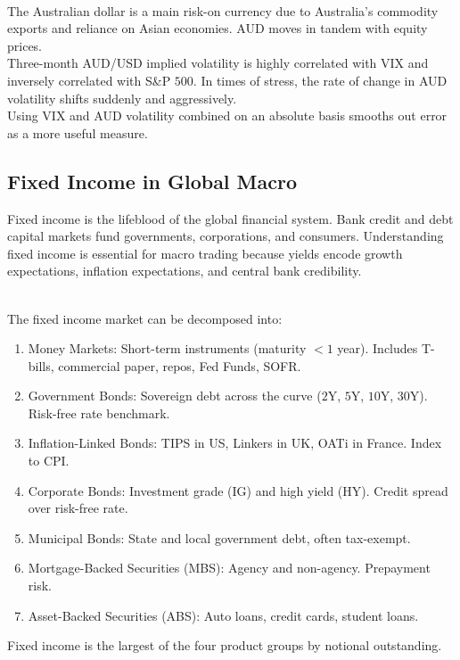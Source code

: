 \documentclass[a4paper,oneside,openany]{book}
\begin{document}
\begin{remark} \\
The Australian dollar is a main risk-on currency due to Australia's commodity exports and reliance on Asian economies. AUD moves in tandem with equity prices.\\
Three-month AUD/USD implied volatility is highly correlated with VIX and inversely correlated with S\&P $500$. In times of stress, the rate of change in AUD volatility shifts suddenly and aggressively.\\
Using VIX and AUD volatility combined on an absolute basis smooths out error as a more useful measure.
\end{remark}

\subsection*{Fixed Income in Global Macro}

Fixed income is the lifeblood of the global financial system. Bank credit and debt capital markets fund governments, corporations, and consumers. Understanding fixed income is essential for macro trading because yields encode growth expectations, inflation expectations, and central bank credibility.

\begin{remark} \\
The fixed income market can be decomposed into:
\begin{enumerate}[label=\roman*.]
\setlength{\itemsep}{0pt}
\item Money Markets: Short-term instruments (maturity $<1$ year). Includes T-bills, commercial paper, repos, Fed Funds, SOFR.
\item Government Bonds: Sovereign debt across the curve ($2$Y, $5$Y, $10$Y, $30$Y). Risk-free rate benchmark.
\item Inflation-Linked Bonds: TIPS in US, Linkers in UK, OATi in France. Index to CPI.
\item Corporate Bonds: Investment grade (IG) and high yield (HY). Credit spread over risk-free rate.
\item Municipal Bonds: State and local government debt, often tax-exempt.
\item Mortgage-Backed Securities (MBS): Agency and non-agency. Prepayment risk.
\item Asset-Backed Securities (ABS): Auto loans, credit cards, student loans.
\end{enumerate}
Fixed income is the largest of the four product groups by notional outstanding.
\end{remark}
\end{document}
